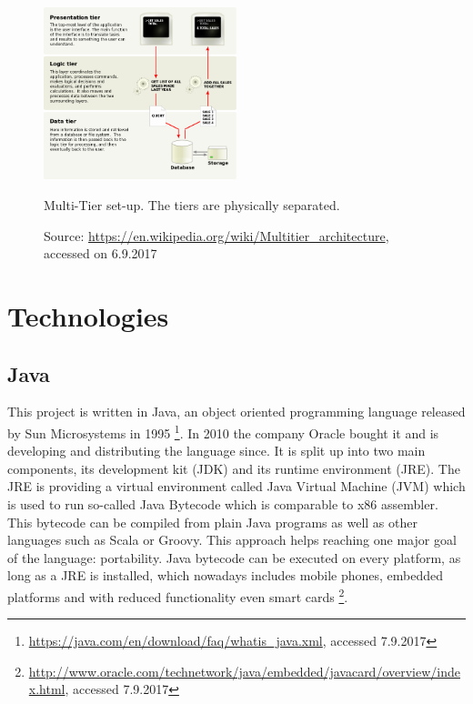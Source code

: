 \begin{figure}[htbp]
	\centering

	\includegraphics[width=0.5\textwidth]{./content/pictures/multi-tier.jpg}
	\caption{Multi-Tier set-up. The tiers are physically separated.}
	\label{fig:multi-tier}
	\caption*{Source: \href{https://en.wikipedia.org/wiki/Multitier\_architecture}{https://en.wikipedia.org/wiki/Multitier\_architecture}, accessed on 6.9.2017}
\end{figure}

\section{Technologies}
\subsection{Java}
This project is written in Java, an object oriented programming language released by Sun Microsystems in 1995  \footnote{\href{https://java.com/en/download/faq/whatis_java.xml}{https://java.com/en/download/faq/whatis\_java.xml}, accessed 7.9.2017}. In 2010 the company Oracle bought it and is developing and distributing the language since. It is split up into two main components, its development kit (JDK) and its runtime environment (JRE). The JRE is providing a virtual environment called Java Virtual Machine (JVM) which is used to run so-called Java Bytecode which is comparable to x86 assembler. This bytecode can be compiled from plain Java programs as well as other languages such as Scala or Groovy. 
This approach helps reaching one major goal of the language: portability. Java bytecode can be executed on every platform, as long as a JRE is installed, which nowadays includes mobile phones, embedded platforms and with reduced functionality even smart cards \footnote{\href{http://www.oracle.com/technetwork/java/embedded/javacard/overview/index.html}{http://www.oracle.com/technetwork/java/embedded/javacard/overview/index.html}, accessed 7.9.2017}. 

